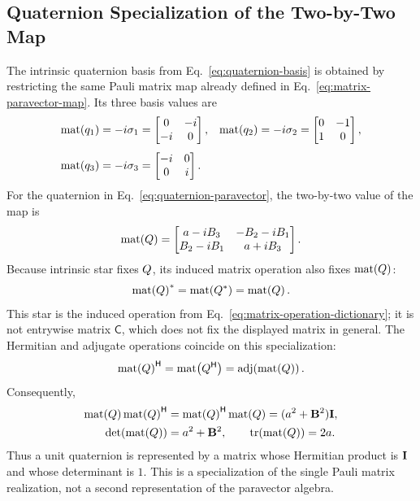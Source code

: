 \subsection{Quaternion Specialization of the Two-by-Two Map}
The intrinsic quaternion basis from Eq.\ \eqref{eq:quaternion-basis} is
obtained by restricting the same Pauli matrix map already defined in
Eq.\ \eqref{eq:matrix-paravector-map}. Its three basis values are
\begin{equation}
\begin{aligned}
\operatorname{mat}\!\left(q_1\right)
&=-i\mathbf{\sigma}_1
=\begin{bmatrix}0&-i\\-i&0\end{bmatrix},&
\operatorname{mat}\!\left(q_2\right)
&=-i\mathbf{\sigma}_2
=\begin{bmatrix}0&-1\\1&0\end{bmatrix},\\[0.35em]
\operatorname{mat}\!\left(q_3\right)
&=-i\mathbf{\sigma}_3
=\begin{bmatrix}-i&0\\0&i\end{bmatrix}.
\end{aligned}
\label{eq:quaternion-matrices}
\end{equation}
For the quaternion in Eq.\ \eqref{eq:quaternion-paravector}, the two-by-two
value of the map is
\begin{equation}
\operatorname{mat}\!\left(Q\right)
=
\begin{bmatrix}
a-iB_3&-B_2-iB_1\\
B_2-iB_1&a+iB_3
\end{bmatrix}.
\label{eq:quaternion-matrix-map}
\end{equation}
Because intrinsic star fixes \(Q\), its induced matrix operation also
fixes \(\operatorname{mat}\!\left(Q\right)\):
\begin{equation*}
\operatorname{mat}\!\left(Q\right)^{*}
=\operatorname{mat}\!\left(Q^{*}\right)
=\operatorname{mat}\!\left(Q\right).
\end{equation*}
This star is the induced operation from
Eq.\ \eqref{eq:matrix-operation-dictionary}; it is not entrywise matrix
\(\mathsf C\), which does not fix the displayed matrix in general.
The Hermitian and adjugate operations coincide on this specialization:
\begin{equation*}
\operatorname{mat}\!\left(Q\right)^{\mathsf H}
=\operatorname{mat}\!\left(Q^{\mathsf H}\right)
=\operatorname{adj}\!\left(\operatorname{mat}\!\left(Q\right)\right).
\end{equation*}
Consequently,
\begin{equation}
\begin{aligned}
\operatorname{mat}\!\left(Q\right)\operatorname{mat}\!\left(Q\right)^{\mathsf H}
&=\operatorname{mat}\!\left(Q\right)^{\mathsf H}\operatorname{mat}\!\left(Q\right)
=(a^2+\mathbf{B}^2)\mathbf{I},\\
\operatorname{det}\!\left(\operatorname{mat}\!\left(Q\right)\right)&=a^2+\mathbf{B}^2,\qquad
\operatorname{tr}(\operatorname{mat}\!\left(Q\right))=2a.
\end{aligned}
\label{eq:quaternion-matrix-norm}
\end{equation}
Thus a unit quaternion is represented by a matrix whose Hermitian product is
\(\mathbf{I}\) and whose determinant is \(1\). This is a specialization of the
single Pauli matrix realization, not a second representation of the
paravector algebra.
